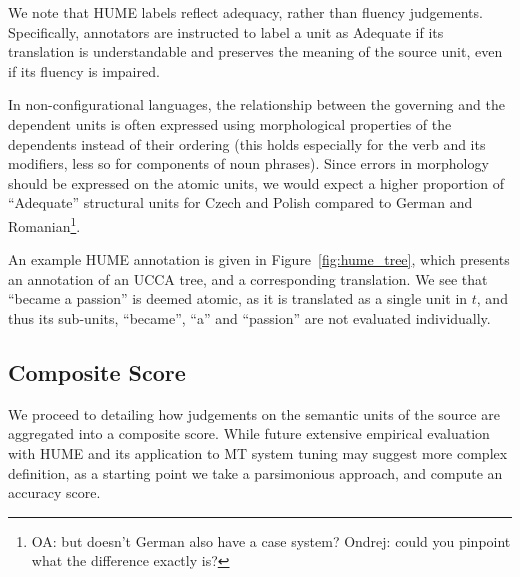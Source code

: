 \documentclass[11pt]{article}
\newcommand{\figref}[1]{Figure~\ref{#1}}
\newcommand{\oa}[1]{\footnote{\color{red}OA: #1}}
\begin{document}
We note that HUME labels reflect adequacy, rather than fluency judgements.
Specifically, annotators are instructed to
label a unit as Adequate if its translation is understandable and preserves
the meaning of the source unit, even if its fluency is impaired.

In non-configurational languages, the relationship between the
governing and the dependent units is often expressed using morphological
properties of the dependents instead of their ordering
(this holds especially for the verb and its modifiers,
less so for components of noun phrases). Since errors in morphology
should be expressed on the atomic units, we would expect
a higher proportion of ``Adequate'' structural units for Czech and Polish
compared to German and Romanian\oa{but doesn't German also have a case system? Ondrej:
  could you pinpoint what the difference exactly is?}.

An example HUME annotation is given in \figref{fig:hume_tree},
which presents an annotation of an UCCA tree, and a corresponding translation.
We see that ``became a passion'' is deemed atomic, as it is translated as a single unit
in $t$, and thus its sub-units, ``became'', ``a'' and ``passion'' are not evaluated
individually. 



\subsection{Composite Score}\label{sec:score}

We proceed to detailing how judgements on the semantic units
of the source are aggregated into a composite score.
While future extensive empirical evaluation with HUME and its application to MT
system tuning may suggest more complex definition,
as a starting point we take a parsimonious approach,
and compute an accuracy score.
\end{document}
